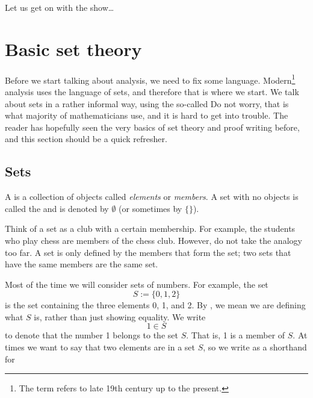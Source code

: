 \medskip

Let us get on with the show\ldots



\sectionnewpage
\section{Basic set theory} \label{sec:basicset}


Before we start talking about analysis, we need to fix some language.
Modern\footnote{The term  refers to late 19th century up to
the present.}
analysis uses the language of sets, and therefore that is where we start.
We talk about sets in a rather informal way, using the so-called
  Do not worry, that is what majority of
mathematicians use, and it is hard to get into trouble.
The reader has hopefully seen the very basics of set theory
and proof writing before, and this section should be a quick refresher.

\subsection{Sets}

\begin{defn}
A \emph{} is a collection of objects called
\emph{elements} or \emph{members}.  A set with
no objects is called the \emph{} and is denoted by
$\emptyset$ (or sometimes by $\{ \}$).
\end{defn}

Think of a set as a club with a certain membership.  For
example, the students who play chess are members of the chess club.  However,
do not take the analogy too far.  A set is only defined by the members
that form the set; two sets that have the same members are the same set.

Most of the time we will consider sets
of numbers.  For example, the set
\begin{equation*}
S := \{ 0, 1, 2 \}
\end{equation*}
is the set containing
the three elements 0, 1, and 2.
By \myquote{$:=$}, we mean we are defining what $S$ is, rather than
just showing equality.
We write
\begin{equation*}
1 \in S
\end{equation*}
to denote that the number 1 belongs to the set $S$.  That is, 1 is a member
of $S$.
At times we want to say that two elements are in a set $S$, so we 
write  as a shorthand for


